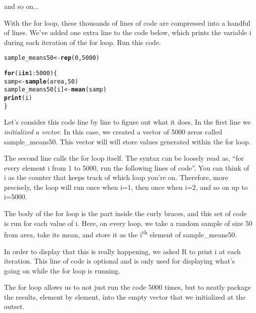 \documentclass{article}\usepackage[]{graphicx}\usepackage[]{color}
\makeatletter
\newcommand{\hlnum}[1]{\textcolor[rgb]{0.686,0.059,0.569}{#1}}%
\newcommand{\hlopt}[1]{\textcolor[rgb]{0,0,0}{#1}}%
\newcommand{\hlstd}[1]{\textcolor[rgb]{0.345,0.345,0.345}{#1}}%
\newcommand{\hlkwa}[1]{\textcolor[rgb]{0.161,0.373,0.58}{\textbf{#1}}}%
\newcommand{\hlkwb}[1]{\textcolor[rgb]{0.69,0.353,0.396}{#1}}%
\newcommand{\hlkwd}[1]{\textcolor[rgb]{0.737,0.353,0.396}{\textbf{#1}}}%
\newenvironment{kframe}{%
 \def\at@end@of@kframe{}%
 \ifinner\ifhmode%
  \def\at@end@of@kframe{\end{minipage}}%
  \begin{minipage}{\columnwidth}%
 \fi\fi%
 \def\FrameCommand##1{\hskip\@totalleftmargin \hskip-\fboxsep
 \colorbox{shadecolor}{##1}\hskip-\fboxsep
     \hskip-\linewidth \hskip-\@totalleftmargin \hskip\columnwidth}%
 \MakeFramed {\advance\hsize-\width
   \@totalleftmargin\z@ \linewidth\hsize
   \@setminipage}}%
 {\par\unskip\endMakeFramed%
 \at@end@of@kframe}
\newenvironment{knitrout}{}{} %
\makeatother
\begin{document}
and so on...

With the for loop, these thousands of lines of code are compressed into a handful of lines. We've added one extra line to the code below, which prints the variable \hlstd{i} during each iteration of the for loop. Run this code.

\begin{knitrout}
\color{fgcolor}\begin{kframe}
\begin{alltt}
\hlstd{sample_means50} \hlkwb{<-} \hlkwd{rep}\hlstd{(}\hlnum{0}\hlstd{,} \hlnum{5000}\hlstd{)}

\hlkwa{for} \hlstd{(i} \hlkwa{in} \hlnum{1}\hlopt{:}\hlnum{5000}\hlstd{) \{}
    \hlstd{samp} \hlkwb{<-} \hlkwd{sample}\hlstd{(area,} \hlnum{50}\hlstd{)}
    \hlstd{sample_means50[i]} \hlkwb{<-} \hlkwd{mean}\hlstd{(samp)}
    \hlkwd{print}\hlstd{(i)}
\hlstd{\}}
\end{alltt}
\end{kframe}
\end{knitrout}


Let's consider this code line by line to figure out what it does.  In the first line we \emph{initialized a vector}.  In this case, we created a vector of 5000 zeros called \hlstd{sample\_means50}.  This vector will will store values generated within the for loop.

The second line calls the for loop itself.  The syntax can be loosely read as, ``for every element \hlstd{i} from 1 to 5000, run the following lines of code''. You can think of \hlstd{i} as the counter that keeps track of which loop you're on. Therefore, more precisely, the loop will run once when \hlstd{i}\hlopt{=}\hlnum{1}, then once when \hlstd{i}\hlopt{=}\hlnum{2}, and so on up to \hlstd{i}\hlopt{=}\hlnum{5000}.

The body of the for loop is the part inside the curly braces, and this set of code is run for each value of \hlstd{i}.  Here, on every loop, we take a random sample of size 50 from \hlstd{area}, take its mean, and store it as the \hlstd{i}\textsuperscript{th} element of \hlstd{sample\_means50}.

In order to display that this is really happening, we asked R to print \hlstd{i} at each iteration. This line of code is optional and is only used for displaying what's going on while the for loop is running.

The for loop allows us to not just run the code 5000 times, but to neatly package the results, element by element, into the empty vector that we initialized at the outset. 
\end{document}
